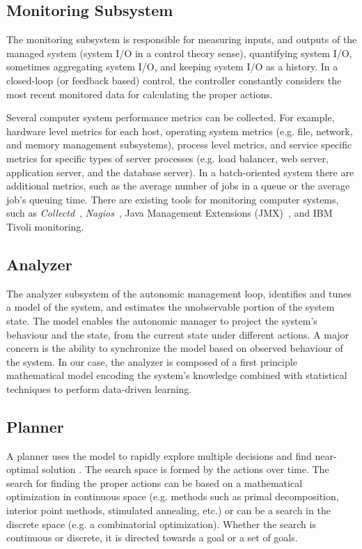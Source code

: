  \subsection{Monitoring Subsystem} The monitoring subsystem is responsible for measuring inputs, and outputs of the managed system (system I/O in a control theory sense), quantifying system I/O, sometimes aggregating system I/O, and keeping system I/O as a history. In a closed-loop (or feedback based) control, the controller constantly considers the most recent monitored data for calculating the proper actions. 

 Several computer system performance metrics can be collected. For example, hardware level metrics for each host, operating system metrics (e.g. file, network, and memory management subsystems), process level metrics, and service specific metrics for specific types of server processes (e.g. load balancer, web server, application server, and the database server). In a batch-oriented system there are additional metrics, such as the average number of jobs in a queue or the average job's queuing time. There are existing tools for monitoring computer systems, such as
 \textit{Collectd}~\cite{collectd}, \textit{Nagios}~\cite{nagios}, Java Management Extensions (JMX)~\cite{jmx}, and IBM Tivoli monitoring\cite{ibm_tivoli_monitoring}. 
  
   \subsection{Analyzer}
    The analyzer subsystem of the autonomic management loop, identifies and tunes a model of the system, and estimates the unobservable portion of the system state. The model enables the autonomic manager to project the system's behaviour and the state, from the current state under different actions.  A major concern is the ability to synchronize the model based on observed behaviour of the system. In our case, the analyzer is composed of a first principle mathematical model encoding the system's knowledge combined with statistical techniques to perform data-driven learning. 

 \subsection{Planner} 
 A planner uses the model to rapidly explore multiple decisions and find near-optimal solution \cite{litoiu_hierarchical_2005,aiber2004autonomic}. The search space is formed by the actions over time. The search for finding the proper actions can be based on a mathematical optimization in continuous space (e.g. methods such as primal decomposition, interior point methods, stimulated annealing, etc.) or can be a search in the discrete space (e.g. a combinatorial optimization).
  Whether the search is continuous or discrete, it is directed towards a goal or a set of goals.

